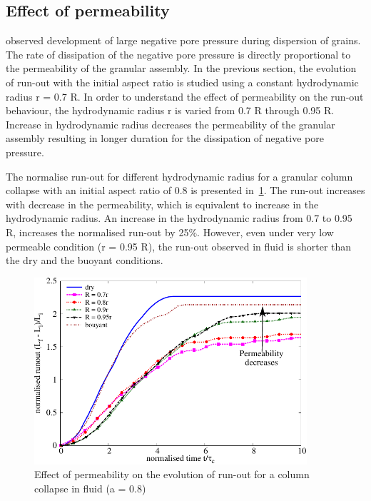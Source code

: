 \clearpage

\subsection{Effect of permeability}
\citet{Topin2011} observed development of large negative pore pressure during 
dispersion of grains. The rate of dissipation of the negative pore pressure is 
directly proportional to the permeability of the granular assembly. In the 
previous section, the evolution of run-out with the initial aspect ratio is 
studied using a constant hydrodynamic radius r = 0.7 R. In order to understand 
the effect of permeability on the run-out behaviour, the hydrodynamic radius r 
is varied from 0.7 R through 0.95 R. Increase in hydrodynamic radius decreases 
the permeability of the granular assembly resulting in longer duration for the 
dissipation of negative pore pressure. 

The normalise run-out for different hydrodynamic radius for a granular column 
collapse with an initial aspect ratio of 0.8 is presented 
in~\cref{fig:Runout_a08_dense}. The run-out increases with decrease in the 
permeability, which is equivalent to increase in the hydrodynamic radius. An 
increase in the hydrodynamic radius from 0.7 to 0.95 R, increases the 
normalised run-out by 25\%. However, even under very low permeable condition (r 
= 0.95 R), the run-out observed in fluid is shorter than the dry and the 
buoyant conditions. 

\begin{figure}[htpb]
\centering
\includegraphics[width=0.9\textwidth]{Runout_a08_dense}
\caption{Effect of permeability on the evolution of run-out for a column 
collapse in fluid (a = 0.8)}
\label{fig:Runout_a08_dense}
\end{figure}

